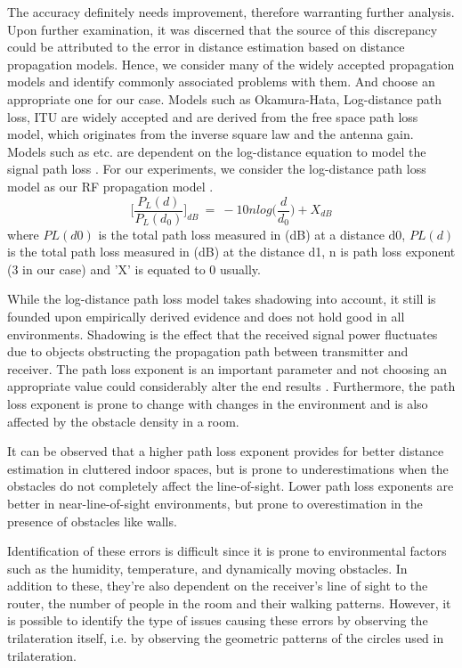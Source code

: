 \documentclass[twocolumn]{svjour3}
\begin{document}
The accuracy definitely needs improvement, therefore warranting further analysis. Upon further examination, it was discerned that the source of this discrepancy could be attributed to the error in distance estimation based on distance propagation models. Hence, we consider many of the widely accepted propagation models and identify commonly associated problems with them. And  choose an appropriate one for our case. Models such as Okamura-Hata, Log-distance path loss, ITU \citep*{seybold2005introduction} are widely accepted and are derived from the free space path loss model, which originates from the inverse square law and the antenna gain.
Models such as  etc. are dependent on the log-distance equation to model the signal path loss \citep*{sarkar2003survey, soorty2015finding}.  For our experiments, we consider the log-distance path loss model as our RF propagation model \citep*{sarkar2003survey, soorty2015finding}.
\begin{equation}
\Bigg[\frac{P_{L}(d)}{P_{L}(d_{0})}\Bigg]_{dB}  ~=~ -10n log\Bigg(\frac{d}{d_{0}}\Bigg) + X_{dB}
\label{pathlosseqn}
\end{equation}
where $PL(d0)$ is the total path loss measured in (dB) at a distance d0, $PL(d)$ is the total path loss measured in (dB) at the distance d1, n is path loss exponent (3 in our case) and 'X' is equated to 0 usually.

While the log-distance path loss model takes shadowing into account, it still is founded upon empirically derived evidence and does not hold good in all environments. Shadowing is the effect that the received signal power fluctuates due to objects obstructing the propagation path between transmitter and receiver. The path loss exponent is an important parameter and not choosing an appropriate value could considerably alter the end results \citep*{srinivasa2009path}. Furthermore, the path loss exponent is prone to change with changes in the environment and is also affected by the obstacle density in a room.

It can be observed that a higher path loss exponent provides for better distance estimation in cluttered indoor spaces, but is prone to underestimations when the obstacles do not completely affect the line-of-sight. Lower path loss exponents are better in near-line-of-sight environments, but prone to overestimation in the presence of obstacles like walls. 

Identification of these errors is difficult since it is prone to environmental factors such as the humidity, temperature, and dynamically moving obstacles. In addition to these, they're also dependent on the receiver's line of sight to the router, the number of people in the room and their walking patterns. However, it is possible to identify the type of issues causing these errors by observing the trilateration itself, i.e. by observing the geometric patterns of the circles used in trilateration.
\end{document}
